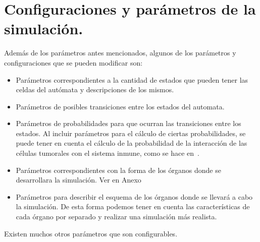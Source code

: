 \section{Configuraciones y par\'ametros de la simulaci\'on.}

Adem\'as de los par\'ametros antes mencionados, algunos de los par\'ametros y configuraciones que se pueden modificar son:
\begin{itemize}
    \item Par\'ametros correspondientes a la cantidad de estados que pueden tener las celdas del aut\'omata y descripciones de los mismos.
    \item Par\'ametros de posibles transiciones entre los estados del automata.
    \item Par\'ametros de probabilidades para que ocurran las transiciones entre los estados. Al incluir par\'ametros para el c\'alculo de ciertas probabilidades, se puede tener en cuenta el c\'alculo de la probabilidad de la interacci\'on de las c\'elulas tumorales con el sistema inmune, como se hace en~\cite{ruanxiaoca}.
    \item Par\'ametros correspondientes con la forma de los \'organos donde se desarrollara la simulaci\'on. Ver en Anexo %
    \item Par\'ametros para describir el esquema de los \'organos donde se llevar\'a a cabo la simulaci\'on. De esta forma podemos tener en cuenta las caracter\'isticas de cada \'organo por separado y realizar una simulaci\'on m\'as realista.
\end{itemize}

Existen muchos otros par\'ametros que son configurables.\\

